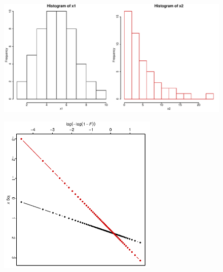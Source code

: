 \begin{frame}   %
\begin{figure}[h]
   \includegraphics[width=4.5in]{hist3.pdf} %
\end{figure}
\end{frame}
\begin{frame}   %
\begin{figure}[h]
   \includegraphics[width=3.0in,angle=90]{Weibull3.pdf} %
   \vspace{-3ex}
\end{figure}
\end{frame}

